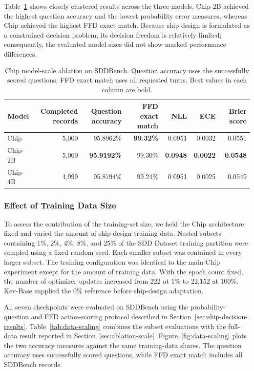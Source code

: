 \documentclass[a4paper,fleqn]{cas-dc}
\begin{document}
Table~\ref{tab:scale-ablation} shows closely clustered results across the three
models. Chip-2B achieved the highest question accuracy and the lowest probability
error measures, whereas Chip achieved the highest FFD exact match. Because
ship design is formulated as a constrained decision problem, its decision
freedom is relatively limited; consequently, the evaluated model sizes did not
show marked performance differences.

\begin{table}[t]
\caption{Chip model-scale ablation on SDDBench. Question accuracy uses the
successfully scored questions. FFD exact match uses all requested turns. Best values in each column are bold.}
\label{tab:scale-ablation}
\centering
\begin{tabular*}{\tblwidth}{@{\extracolsep{\fill}}lrrrrrr@{}}
\toprule
Model & Completed records & Question accuracy & FFD exact match & NLL & ECE & Brier score \\
\midrule
Chip & 5,000 & 95.8962\% & \textbf{99.32\%} & 0.0951 & 0.0032 & 0.0551 \\
Chip-2B   & 5,000 & \textbf{95.9192\%} & 99.30\% & \textbf{0.0948} & \textbf{0.0022} & \textbf{0.0548} \\
Chip-4B   & 4,999 & 95.8794\% & 99.24\% & 0.0951 & 0.0025 & 0.0549 \\
\bottomrule
\end{tabular*}
\end{table}

\subsubsection{Effect of Training Data Size}
\label{sec:ablation-data}

To assess the contribution of the training-set size, we held the Chip
architecture fixed and varied the amount of ship-design training data. Nested
subsets containing 1\%, 2\%, 4\%, 8\%, and 25\% of the SDD Dataset training
partition were sampled using a fixed random seed. Each smaller subset was contained in every larger subset. The training
configuration was identical to the main Chip experiment except for the amount of
training data. With the epoch count fixed, the number of optimizer updates
increased from 222 at 1\% to 22,152 at 100\%. Kev-Base supplied the 0\% reference
before ship-design adaptation.

All seven checkpoints were evaluated on SDDBench using the probability-question
and FFD action-scoring protocol described in
Section~\ref{sec:ship-decision-results}. Table~\ref{tab:data-scaling} combines
the subset evaluations with the full-data result reported in
Section~\ref{sec:ablation-scale}. Figure~\ref{fig:data-scaling} plots the two
accuracy measures against the same training-data shares. The question accuracy
uses successfully scored questions, while FFD exact match includes all SDDBench
records.
\end{document}
